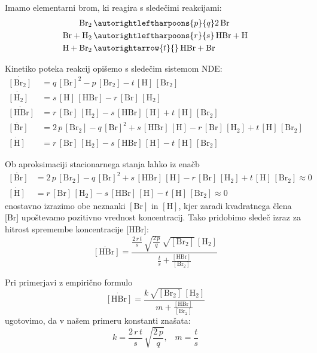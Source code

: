 Imamo elementarni brom, ki reagira s sledečimi reakcijami:
\begin{align}
    \text{Br}_2 \, &\autorightleftharpoons{p}{q} 2\,\text{Br} \\ \nonumber
    \text{Br} + \text{H}_2 \, &\autorightleftharpoons{r}{s} \,\text{HBr} + \text{H} \\ \nonumber
    \text{H} + \text{Br}_2 \, &\autorightarrow{t}{} \, \text{HBr} + \text{Br}
\end{align}

Kinetiko poteka reakcij opišemo s sledečim sistemom NDE:
\begin{align}
    \dot{[\text{Br}_2]} &= q\,[\text{Br}]^2 - p\,[\text{Br}_2] - t\,[\text{H}]\,[\text{Br}_2] \\ \nonumber
    \dot{[\text{H}_2]} &= s \, [\text{H}] \, [\text{HBr}] - r \, [\text{Br}] \, [\text{H}_2] \\ \nonumber
    \dot{[\text{HBr}]} &= r\,[\text{Br}]\,[\text{H}_2] - s\,[\text{HBr}]\,[\text{H}] + t\,[\text{H}]\,[\text{Br}_2]\\ \nonumber
    \dot{[\text{Br}]} &= 2\,p\,[\text{Br}_2] - q\,[\text{Br}]^2 + s\,[\text{HBr}]\,[\text{H}] - r\,[\text{Br}]\,[\text{H}_2] + t\,[\text{H}]\,[\text{Br}_2]\\ \nonumber
    \dot{[\text{H}]} &= r\,[\text{Br}]\,[\text{H}_2] - s\,[\text{HBr}]\,[\text{H}] - t\,[\text{H}]\,[\text{Br}_2]
\end{align}

Ob aproksimaciji stacionarnega stanja lahko iz enačb
\begin{align}
    \dot{[\text{Br}]} &= 2\,p\,[\text{Br}_2] - q\,[\text{Br}]^2 + s\,[\text{HBr}]\,[\text{H}] - r\,[\text{Br}]\,[\text{H}_2] + t\,[\text{H}]\,[\text{Br}_2] \approx 0 \\ \nonumber
    \dot{[\text{H}]} &= r\,[\text{Br}]\,[\text{H}_2] - s\,[\text{HBr}]\,[\text{H}] - t\,[\text{H}]\,[\text{Br}_2] \approx 0 
\end{align}
enostavno izrazimo obe neznanki $[\text{Br}]$ in $[\text{H}]$, kjer zaradi kvadratnega člena [Br] upoštevamo pozitivno vrednost koncentracij. Tako pridobimo sledeč izraz za hitrost spremembe koncentracije [HBr]:
\begin{equation}
    \dot{[\text{HBr}]} = \frac{ \frac{2\, r\, t}{s} \, \sqrt{\frac{2\,p}{q}} \, \sqrt{[\text{Br}_2]} \, [\text{H}_2]}{ \frac{t}{s} + \frac{[\text{HBr}]}{[\text{Br}_2]}}
\end{equation}

Pri primerjavi z empirično formulo
\begin{equation}
    \dot{[\text{HBr}]} = \frac{ k \, \sqrt{[\text{Br}_2]} \, [\text{H}_2]}{ m + \frac{[\text{HBr}]}{[\text{Br}_2]}}
\end{equation}
ugotovimo, da v našem primeru konstanti znašata:
\begin{equation}
    k = \frac{2\, r\, t}{s} \, \sqrt{\frac{2\,p}{q}}\text{,} \quad m =  \frac{t}{s}
\end{equation}

